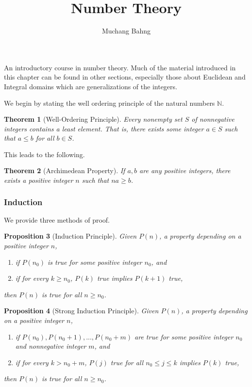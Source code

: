 \documentclass{article}
\newtheorem{theorem}{Theorem}[section]
\newtheorem{proposition}[theorem]{Proposition}
\theoremstyle{remark}
\theoremstyle{definition}
\begin{document}
\pagestyle{fancy}

\cfoot{\thepage / \pageref{LastPage}}

\title{Number Theory}
\author{Muchang Bahng}

\maketitle
\tableofcontents
\pagebreak

An introductory course in number theory. Much of the material introduced in this chapter can be found in other sections, especially those about Euclidean and Integral domains which are generalizations of the integers. 

We begin by stating the well ordering principle of the natural numbers $\mathbb{N}$. 

\begin{theorem}[Well-Ordering Principle]
Every nonempty set $S$ of nonnegative integers contains a least element. That is, there exists some integer $a \in S$ such that $a \leq b$ for all $b \in S$. 
\end{theorem}

This leads to the following. 

\begin{theorem}[Archimedean Property]
If $a, b$ are any positive integers, there exists a positive integer $n$ such that $n a \geq b$. 
\end{theorem}

\subsubsection{Induction}
We provide three methods of proof. 

\begin{proposition}[Induction Principle]
Given $P(n)$, a property depending on a positive integer $n$, 
\begin{enumerate}
    \item if $P(n_0)$ is true for some positive integer $n_0$, and 
    \item if for every $k \geq n_0$, $P(k)$ true implies $P(k+1)$ true, 
\end{enumerate}
then $P(n)$ is true for all $n \geq n_0$. 
\end{proposition}

\begin{proposition}[Strong Induction Principle]
Given $P(n)$, a property depending on a positive integer $n$, 
\begin{enumerate}
    \item if $P(n_0), P(n_0 + 1), ..., P(n_0 +m)$ are true for some positive integer $n_0$ and nonnegative integer $m$, and
    \item if for every $k > n_0 + m$, $P(j)$ true for all $n_0 \leq j \leq k$ implies $P(k)$ true, 
\end{enumerate}
then $P(n)$ is true for all $n \geq n_0$. 
\end{proposition}
\end{document}
